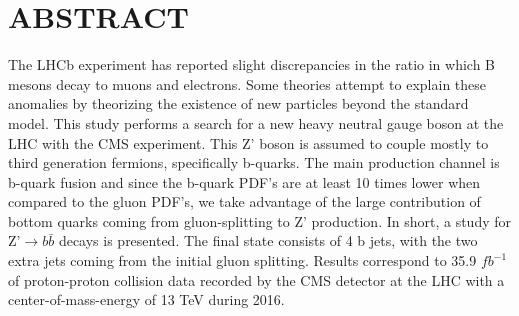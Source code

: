%
%
%
%

\chapter*{ABSTRACT}

\pagestyle{plain} %
\setcounter{page}{2}

\indent The LHCb experiment has reported slight discrepancies in the ratio in which B mesons decay to muons and electrons. Some theories attempt to explain these anomalies by theorizing the existence of new particles beyond the standard model. This study performs a search for a new heavy neutral gauge boson at the LHC with the CMS experiment. This Z' boson is assumed to couple mostly to third generation fermions, specifically b-quarks. The main production channel is b-quark fusion and since the b-quark PDF's are at least 10 times lower when compared to the gluon PDF's, we take advantage of the large contribution of bottom quarks coming from gluon-splitting to Z' production. In short, a study for Z'$\rightarrow b\bar{b}$ decays is presented. The final state consists of 4 b jets, with the two extra jets coming from the initial gluon splitting. Results correspond to 35.9 $fb^{-1}$ of proton-proton collision data recorded by the CMS detector at the LHC with a center-of-mass-energy of 13 TeV during 2016.


 

\pagebreak{}
